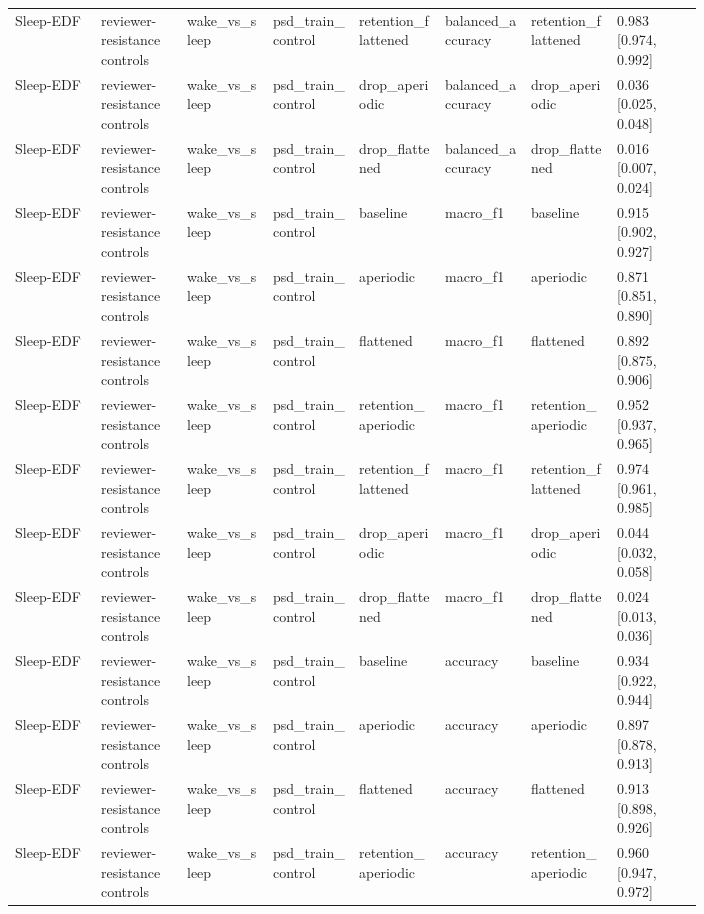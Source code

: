 \begin{longtable}{p{0.10\linewidth}p{0.10\linewidth}p{0.10\linewidth}p{0.10\linewidth}p{0.10\linewidth}p{0.10\linewidth}p{0.10\linewidth}p{0.10\linewidth}}
Sleep-EDF & reviewer-resistance controls & wake\_vs\_sleep & psd\_train\_control & retention\_flattened & balanced\_accuracy & retention\_flattened & 0.983 [0.974, 0.992]\\
Sleep-EDF & reviewer-resistance controls & wake\_vs\_sleep & psd\_train\_control & drop\_aperiodic & balanced\_accuracy & drop\_aperiodic & 0.036 [0.025, 0.048]\\
Sleep-EDF & reviewer-resistance controls & wake\_vs\_sleep & psd\_train\_control & drop\_flattened & balanced\_accuracy & drop\_flattened & 0.016 [0.007, 0.024]\\
Sleep-EDF & reviewer-resistance controls & wake\_vs\_sleep & psd\_train\_control & baseline & macro\_f1 & baseline & 0.915 [0.902, 0.927]\\
Sleep-EDF & reviewer-resistance controls & wake\_vs\_sleep & psd\_train\_control & aperiodic & macro\_f1 & aperiodic & 0.871 [0.851, 0.890]\\
Sleep-EDF & reviewer-resistance controls & wake\_vs\_sleep & psd\_train\_control & flattened & macro\_f1 & flattened & 0.892 [0.875, 0.906]\\
Sleep-EDF & reviewer-resistance controls & wake\_vs\_sleep & psd\_train\_control & retention\_aperiodic & macro\_f1 & retention\_aperiodic & 0.952 [0.937, 0.965]\\
Sleep-EDF & reviewer-resistance controls & wake\_vs\_sleep & psd\_train\_control & retention\_flattened & macro\_f1 & retention\_flattened & 0.974 [0.961, 0.985]\\
Sleep-EDF & reviewer-resistance controls & wake\_vs\_sleep & psd\_train\_control & drop\_aperiodic & macro\_f1 & drop\_aperiodic & 0.044 [0.032, 0.058]\\
Sleep-EDF & reviewer-resistance controls & wake\_vs\_sleep & psd\_train\_control & drop\_flattened & macro\_f1 & drop\_flattened & 0.024 [0.013, 0.036]\\
Sleep-EDF & reviewer-resistance controls & wake\_vs\_sleep & psd\_train\_control & baseline & accuracy & baseline & 0.934 [0.922, 0.944]\\
Sleep-EDF & reviewer-resistance controls & wake\_vs\_sleep & psd\_train\_control & aperiodic & accuracy & aperiodic & 0.897 [0.878, 0.913]\\
Sleep-EDF & reviewer-resistance controls & wake\_vs\_sleep & psd\_train\_control & flattened & accuracy & flattened & 0.913 [0.898, 0.926]\\
Sleep-EDF & reviewer-resistance controls & wake\_vs\_sleep & psd\_train\_control & retention\_aperiodic & accuracy & retention\_aperiodic & 0.960 [0.947, 0.972]\\

\end{longtable}
